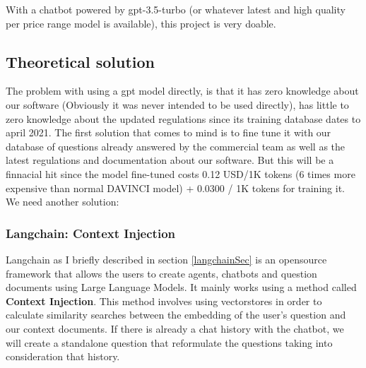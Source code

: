 \documentclass[a4paper,12pt,twoside]{report}
\begin{document}
With a chatbot powered by gpt-3.5-turbo (or whatever latest and high quality per price range model is available), this project is very doable.
\subsection{Theoretical solution}
The problem with using a gpt model directly, is that it has zero knowledge about our software (Obviously it was never intended to be used directly), has little to zero knowledge about the updated regulations since its training database dates to april 2021. 
The first solution that comes to mind is to fine tune it with our database of questions already answered by the commercial team as well as the latest regulations and documentation about our software. But this will be a finnacial hit since the model fine-tuned costs 0.12 USD/1K tokens (6 times more expensive than normal DAVINCI model) + 0.0300 / 1K tokens for training it. We need another solution:
\subsubsection{Langchain: Context Injection}
Langchain as I briefly described in section \ref{langchainSec} is an opensource framework that allows the users to create agents, chatbots and question documents using Large Language Models. It mainly works using a method called \textbf{Context Injection}. This method involves using vectorstores in order to calculate similarity searches between the embedding of the user's question and our context documents. If there is already a chat history with the chatbot, we will create a standalone question that reformulate the questions taking into consideration that history.
\end{document}
